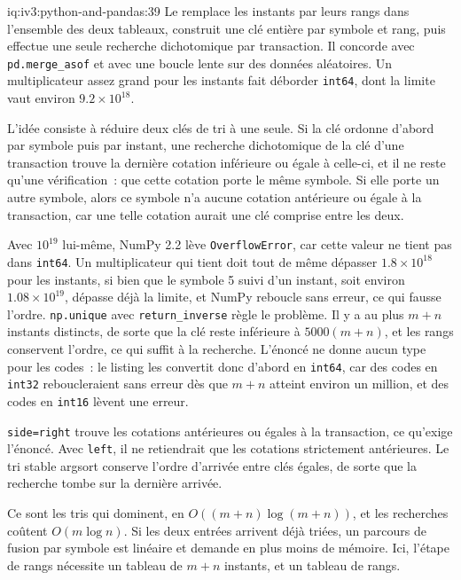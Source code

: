 \begin{solution}{iq:iv3:python-and-pandas:39}
Le  remplace les instants par leurs rangs dans l'ensemble des deux tableaux, construit une clé entière par symbole et rang, puis effectue une seule recherche dichotomique par transaction. Il concorde avec \texttt{pd.merge\_asof} et avec une boucle lente sur des données aléatoires. Un multiplicateur assez grand pour les instants fait déborder \texttt{int64}, dont la limite vaut environ $9.2 \times 10^{18}$.
\label{lst:iv3:pp:asofnp}

L'idée consiste à réduire deux clés de tri à une seule. Si la clé ordonne d'abord par symbole puis par instant, une recherche dichotomique de la clé d'une transaction trouve la dernière cotation inférieure ou égale à celle-ci, et il ne reste qu'une vérification~: que cette cotation porte le même symbole. Si elle porte un autre symbole, alors ce symbole n'a aucune cotation antérieure ou égale à la transaction, car une telle cotation aurait une clé comprise entre les deux.

Avec $10^{19}$ lui-même, NumPy 2.2 lève \texttt{OverflowError}, car cette valeur ne tient pas dans \texttt{int64}. Un multiplicateur qui tient doit tout de même dépasser $1.8 \times 10^{18}$ pour les instants, si bien que le symbole 5 suivi d'un instant, soit environ $1.08 \times 10^{19}$, dépasse déjà la limite, et NumPy reboucle sans erreur, ce qui fausse l'ordre. \texttt{np.unique} avec \texttt{return\_inverse} règle le problème. Il y a au plus $m + n$ instants distincts, de sorte que la clé reste inférieure à $5000 (m + n)$, et les rangs conservent l'ordre, ce qui suffit à la recherche. L'énoncé ne donne aucun type pour les codes~: le listing les convertit donc d'abord en \texttt{int64}, car des codes en \texttt{int32} reboucleraient sans erreur dès que $m + n$ atteint environ un million, et des codes en \texttt{int16} lèvent une erreur.

\texttt{side=\textquotesingle right\textquotesingle} trouve les cotations antérieures ou égales à la transaction, ce qu'exige l'énoncé. Avec \texttt{left}, il ne retiendrait que les cotations strictement antérieures. Le tri stable argsort conserve l'ordre d'arrivée entre clés égales, de sorte que la recherche tombe sur la dernière arrivée.

Ce sont les tris qui dominent, en $O((m + n) \log (m + n))$, et les recherches coûtent $O(m \log n)$. Si les deux entrées arrivent déjà triées, un parcours de fusion par symbole est linéaire et demande en plus moins de mémoire. Ici, l'étape de rangs nécessite un tableau de $m + n$ instants, et un tableau de rangs.

\end{solution}


